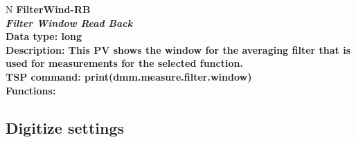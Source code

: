 \documentclass[openany]{article}
\begin{document}
		\begin{tabular}{N}
			\hline
			\bfseries FilterWind-RB\label{pv:filterwind-rb} \\ \hline
			\emph{Filter Window Read Back} \\
			Data type: long \\
			Description: This PV shows the window for the averaging filter that is used for measurements for the selected function. \\
			TSP command: print(dmm.measure.filter.window) \\
			Functions: \\
			\arrayrulecolor{\FuncTableBorderColor}

		\end{tabular}
	
	\subsection{Digitize settings}\label{pvgroup:digitize-settings}

		\paragraph{} %
\end{document}
